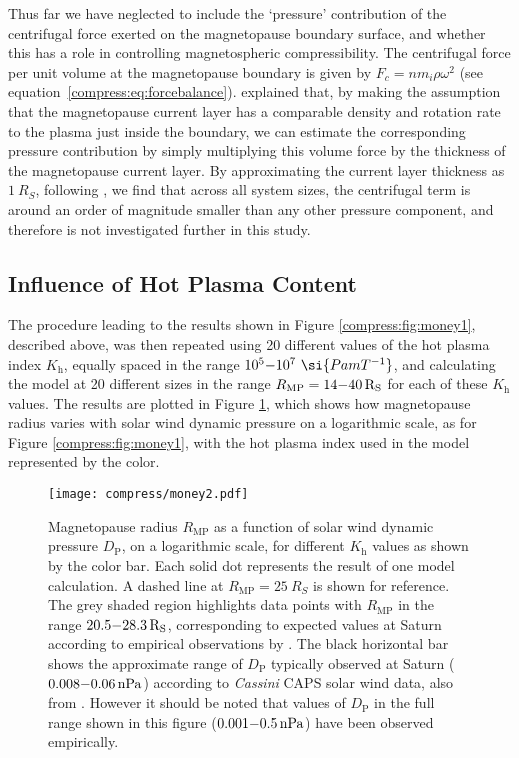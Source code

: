 Thus far we have neglected to include the `pressure' contribution of the centrifugal force exerted on the magnetopause boundary surface, and whether this has a role in controlling magnetospheric compressibility. The centrifugal force per unit volume at the magnetopause boundary is given by $F_c = nm_i\rho\omega^2$ (see equation~\ref{compress:eq:forcebalance}). \citet{pilkington2014} explained that, by making the assumption that the magnetopause current layer has a comparable density and rotation rate to the plasma just inside the boundary, we can estimate the corresponding pressure contribution by simply multiplying this volume force by the thickness of the magnetopause current layer. By approximating the current layer thickness as $\SI{1}{R_S}$, following \citet{masters2011}, we find that across all system sizes, the centrifugal term is around an order of magnitude smaller than any other pressure component, and therefore is not investigated further in this study.

\subsection{Influence of Hot Plasma Content} \label{compress:sec:hotplasma}
The procedure leading to the results shown in Figure \ref{compress:fig:money1}, described above, was then repeated using 20 different values of the hot plasma index $K_\mathrm{h}$, equally spaced in the range $10^5 {\--} 10^7~\si{Pa m T^{-1}}$, and calculating the model at 20 different sizes in the range $R_\mathrm{MP} = 14{\--}\SI{40}{R_S}$ for each of these $K_\mathrm{h}$ values. The results are plotted in Figure \ref{compress:fig:money2}, which shows how magnetopause radius varies with solar wind dynamic pressure on a logarithmic scale, as for Figure \ref{compress:fig:money1}, with the hot plasma index used in the model represented by the color.
\begin{figure}
\centering
\noindent\texttt{[image: compress/money2.pdf]}
\caption[Magnetopause radius versus solar wind dynamic pressure compressibility profiles for a range of $K_\mathrm{H}$.]{Magnetopause radius $R_\mathrm{MP}$ as a function of solar wind dynamic pressure $D_\mathrm{P}$, on a logarithmic scale, for different $K_\mathrm{h}$ values as shown by the color bar. Each solid dot represents the result of one model calculation. A dashed line at $R_\mathrm{MP}{=}\SI{25}{R_S}$ is shown for reference. The grey shaded region highlights data points with $R_\mathrm{MP}$ in the range $20.5{\--}\SI{28.3}{R_S}$, corresponding to expected values at Saturn according to empirical observations by \citet{achilleos2008}. The black horizontal bar shows the approximate range of $D_\mathrm{P}$ typically observed at Saturn ($0.008 {\--} \SI{0.06}{nPa}$) according to \textit{Cassini} CAPS solar wind data, also from \citet{achilleos2008}. However it should be noted that values of $D_\mathrm{P}$ in the full range shown in this figure ($0.001 {\--} \SI{0.5}{nPa}$) have been observed empirically.} 
\label{compress:fig:money2}
\end{figure}
 
